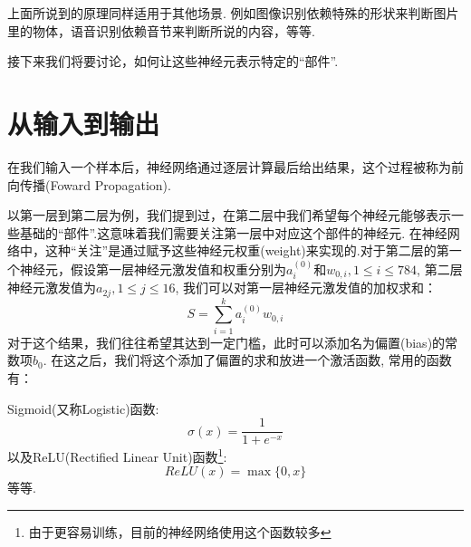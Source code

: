 \documentclass[UTF8]{ctexbook}
\begin{document}
上面所说到的原理同样适用于其他场景. 例如图像识别依赖特殊的形状来判断图片里的物体，语音识别依赖音节来判断所说的内容，等等.

接下来我们将要讨论，如何让这些神经元表示特定的“部件”.
\section{从输入到输出}
在我们输入一个样本后，神经网络通过逐层计算最后给出结果，这个过程被称为前向传播(Foward Propagation).

以第一层到第二层为例，我们提到过，在第二层中我们希望每个神经元能够表示一些基础的“部件”.这意味着我们需要关注第一层中对应这个部件的神经元. 
在神经网络中，这种“关注”是通过赋予这些神经元权重(weight)来实现的.对于第二层的第一个神经元，假设第一层神经元激发值和权重分别为$a_{i}^{(0)}$和$w_{0,i}, 1\leq i\leq 784$, 
第二层神经元激发值为$a_{2j}, 1\leq j\leq 16$, 我们可以对第一层神经元激发值的加权求和：
\[S=\sum_{i=1} ^{k}a_{i}^{(0)}w_{0,i}\]
对于这个结果，我们往往希望其达到一定门槛，此时可以添加名为偏置(bias)的常数项$b_0$. 
在这之后，我们将这个添加了偏置的求和放进一个激活函数, 常用的函数有：

\noindent Sigmoid(又称Logistic)函数:
\[\sigma(x)=\frac{1}{1+e^{-x}}\]
以及ReLU(Rectified Linear Unit)函数\footnote{由于更容易训练，目前的神经网络使用这个函数较多}:
\[ReLU(x)=\max \{0,x\}\]
等等.
\end{document}
